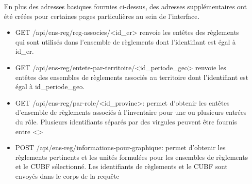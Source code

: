 En plus des adresses basiques fournies ci-dessus, des adresses supplémentaires ont été créées pour certaines pages particulières au sein de l'interface. 
\begin{itemize}
    \item GET /api/ens-reg/reg-associes/<id\_er> renvoie les entêtes des règlements qui sont utilisés dans l'ensemble de règlements dont l'identifiant est égal à id\_er.
    \item GET /api/ens-reg/entete-par-territoire/<id\_periode\_geo> renvoie les entêtes des ensembles de règlements associés au territoire dont l'identifiant est égal à id\_periode\_geo.
    \item GET /api/ens-reg/par-role/<id\_provinc>: permet d'obtenir les entêtes d'ensemble de règlements associés à l'inventaire pour une ou plusieurs entrées du rôle. Plusieurs identifiants séparés par des virgules peuvent être fournis entre <>
    \item POST /api/ens-reg/informations-pour-graphique: permet d'obtenir les règlements pertinents et les unités formulées pour les ensembles de règlements et le \ac{CUBF} sélectionné. Les identifiants de règlements et le \ac{CUBF} sont envoyés dans le corps de la requête
\end{itemize}

